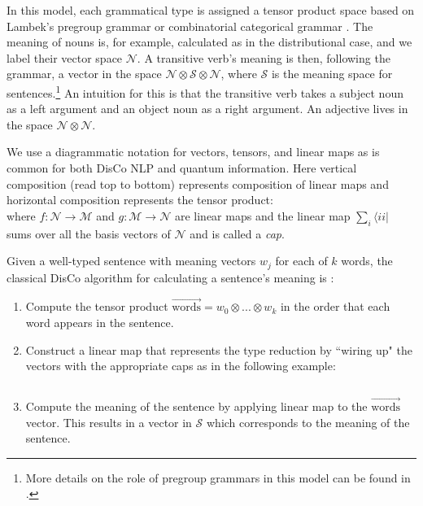 In this model, each grammatical type is assigned a tensor product space based on Lambek's pregroup grammar \cite{lambek2008word} or combinatorial categorical grammar \cite{hermann2013role}. The meaning of nouns is, for example, calculated as in the distributional case, and we label their vector space $\mathcal{N}$.  A transitive verb's meaning is then, following the grammar, a vector in the space $\mathcal{N}\otimes \mathcal{S} \otimes \mathcal{N}$, where $\mathcal{S}$ is the meaning space for sentences.\footnote{More details on the role of pregroup grammars in this model can be found in \cite{clark2008compositional}.} An intuition for this is that the transitive verb takes a subject noun as a left argument and an object noun as a right argument. An adjective lives in the space $\mathcal{N}\otimes\mathcal{N}$.

We use a diagrammatic notation for vectors, tensors, and linear maps as is common for both DisCo NLP and quantum information. Here vertical composition (read top to bottom) represents composition of linear maps and horizontal composition represents the tensor product:
\begin{equation*}

\end{equation*}
where $f:\mathcal{N}\to\mathcal{M}$ and $g:\mathcal{M}\to\mathcal{N}$ are linear maps and the linear map $\sum_i\langle ii|$ sums over all the basis vectors of $\mathcal{N}$ and is called a \emph{cap}.

Given a well-typed sentence with meaning vectors $w_j$ for each of $k$ words, the classical DisCo algorithm for calculating a sentence's meaning is \cite{clark2013quantum}:
\begin{enumerate}
\item Compute the tensor product $\overrightarrow{\mbox{words}}=w_0\otimes...\otimes w_k$ in the order that each word appears in the sentence.

\item Construct a linear map that represents the type reduction by ``wiring up" the vectors with the appropriate caps as in the following example:

\begin{equation}
\label{eq:svo}

\end{equation}

\item Compute the meaning of the sentence by applying linear map to the $\overrightarrow{\mbox{words}}$ vector. This results in a vector in $\mathcal{S}$ which corresponds to the meaning of the sentence.
\end{enumerate}

